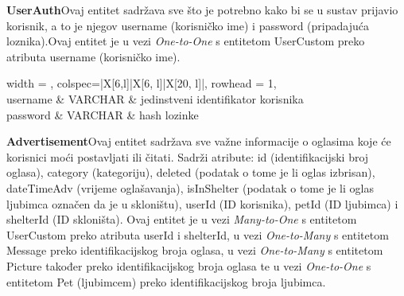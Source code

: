 			\textbf{UserAuth}\hspace{10pt}Ovaj entitet sadržava sve što je potrebno kako bi se u sustav prijavio korisnik, a to je njegov username (korisničko ime) i password (pripadajuća loznika).Ovaj entitet je u vezi
			\textit{One-to-One} s entitetom UserCustom preko atributa username (korisničko ime).
			
				\begin{longtblr}[
					label=none,
					entry=none
					]{
						width = \textwidth,
						colspec={|X[6,l]|X[6, l]|X[20, l]|}, 
						rowhead = 1,
					} %
					\hline {}	 \\ \hline[3pt]
						username & VARCHAR &  jedinstveni identifikator korisnika  	\\ \hline
					password & VARCHAR	&  hash lozinke	\\ \hline
				\end{longtblr}
				
			
			\textbf{Advertisement}\hspace{10pt}Ovaj entitet sadržava sve važne informacije o oglasima koje će korisnici moći postavljati ili čitati.
			Sadrži atribute: id (identifikacijski broj oglasa), category (kategoriju), deleted (podatak o tome je li oglas izbrisan), dateTimeAdv (vrijeme oglašavanja), isInShelter (podatak o tome je li oglas ljubimca označen da je u skloništu), userId (ID korisnika), petId (ID ljubimca) i shelterId (ID skloništa).
			Ovaj entitet je u vezi
			\textit{Many-to-One} s entitetom UserCustom preko atributa userId i shelterId,
			u vezi \textit{One-to-Many} s entitetom Message preko identifikacijskog broja oglasa,
			u vezi \textit{One-to-Many} s entitetom Picture također preko identifikacijskog broja oglasa
			te u vezi \textit{One-to-One} s entitetom Pet (ljubimcem) preko identifikacijskog broja ljubimca.
			
